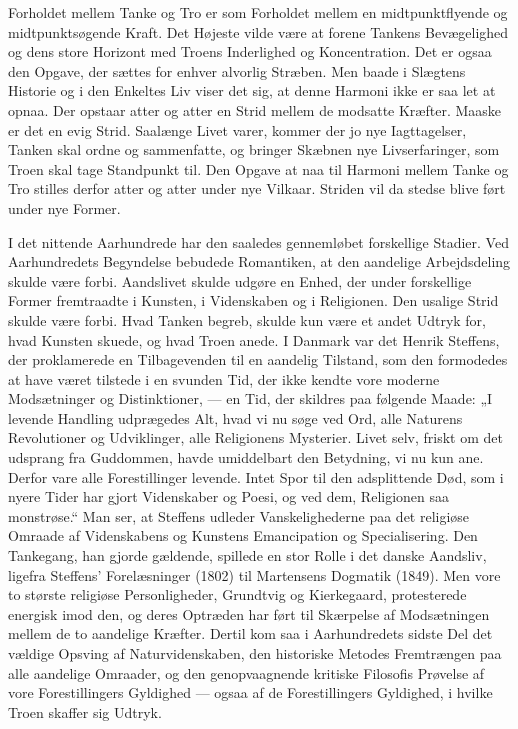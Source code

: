 \documentclass[12pt,a4paper]{article}
\newcommand{\opage}[1]{\marginnote{\footnotesize\textit{[#1]}}}
\begin{document}
Forholdet mellem Tanke og Tro er som Forholdet mellem en midtpunktflyende og
midtpunktsøgende Kraft. Det Højeste vilde være at forene Tankens
Bevægelighed og dens store Horizont med Troens Inderlighed og Koncentration.
Det er ogsaa den Opgave, der sættes for enhver alvorlig Stræben. Men baade i
Slægtens Historie og i den Enkeltes Liv viser det sig, at denne Harmoni ikke
er saa let at opnaa. Der opstaar atter og atter en Strid mellem de modsatte
Kræfter. Maaske er det en evig Strid. Saalænge Livet varer, kommer der jo nye
Iagttagelser, Tanken skal ordne og sammenfatte, og bringer Skæbnen nye
Livserfaringer, som Troen skal tage Standpunkt til. Den Opgave at naa til
Harmoni mellem Tanke og Tro stilles derfor atter og atter under nye Vilkaar.
Striden vil da stedse blive ført under nye Former.

I det nittende Aarhundrede har den saaledes gennemløbet forskellige Stadier.
Ved Aarhundredets Begyndelse bebudede Romantiken, at den aandelige
Arbejdsdeling skulde være forbi. Aandslivet skulde udgøre en Enhed, der under
forskellige Former fremtraadte i Kunsten, i Videnskaben og i Religionen. Den
usalige Strid skulde være forbi. Hvad Tanken begreb, skulde kun være et andet
Udtryk for, hvad Kunsten skuede, og hvad Troen anede. I Danmark var det
Henrik Steffens, der proklamerede en Tilbagevenden til en aandelig Tilstand,
som den formodedes at have været tilstede i en svunden Tid, der ikke kendte
vore moderne Modsætninger og Distinktioner, --- en Tid, der skildres paa
følgende Maade: „I \opage{38} levende Handling udprægedes Alt, hvad vi nu søge ved Ord,
alle Naturens Revolutioner og Udviklinger, alle Religionens Mysterier. Livet
selv, friskt om det udsprang fra Guddommen, havde umiddelbart den Betydning,
vi nu kun ane. Derfor vare alle Forestillinger levende. Intet Spor til den
adsplittende Død, som i nyere Tider har gjort Videnskaber og Poesi, og ved
dem, Religionen saa monstrøse.“ Man ser, at Steffens udleder
Vanskelighederne paa det religiøse Omraade af Videnskabens og Kunstens
Emancipation og Specialisering. Den Tankegang, han gjorde gældende, spillede
en stor Rolle i det danske Aandsliv, ligefra Steffens' Forelæsninger (1802)
til Martensens Dogmatik (1849). Men vore to største religiøse Personligheder,
Grundtvig og Kierkegaard, protesterede energisk imod den, og deres Optræden
har ført til Skærpelse af Modsætningen mellem de to aandelige Kræfter. Dertil
kom saa i Aarhundredets sidste Del det vældige Opsving af Naturvidenskaben,
den historiske Metodes Fremtrængen paa alle aandelige Omraader, og den
genopvaagnende kritiske Filosofis Prøvelse af vore Forestillingers Gyldighed
--- ogsaa af de Forestillingers Gyldighed, i hvilke Troen skaffer sig Udtryk.
\end{document}
